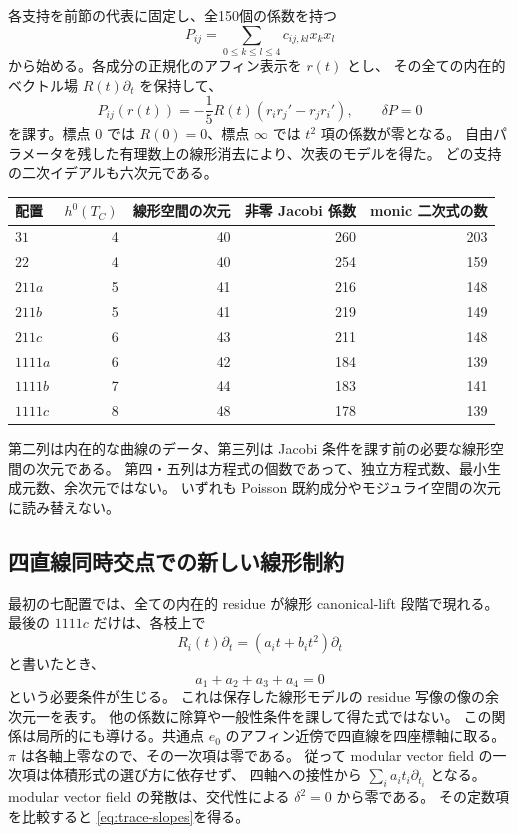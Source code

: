 \documentclass[11pt,a4paper]{ltjsarticle}
\theoremstyle{remark}\newtheorem{remark}[theorem]{注意}
\begin{document}
各支持を前節の代表に固定し、全150個の係数を持つ
\[
P_{ij}=\sum_{0\le k\le l\le4}c_{ij,kl}x_kx_l
\]
から始める。各成分の正規化のアフィン表示を $r(t)$ とし、
その全ての内在的ベクトル場 $R(t)\partial_t$ を保持して、
\begin{equation}\label{eq:tree-restriction}
P_{ij}(r(t))=-\frac15R(t)(r_i r_j'-r_j r_i'),\qquad \delta P=0
\end{equation}
を課す。標点 $0$ では $R(0)=0$、標点 $\infty$ では $t^2$ 項の係数が零となる。
自由パラメータを残した有理数上の線形消去により、次表のモデルを得た。
どの支持の二次イデアルも六次元である。

\begin{center}
\begin{tabular}{@{}lrrrr@{}}
\toprule
配置 & $h^0(T_C)$ & 線形空間の次元 & 非零 Jacobi 係数 & monic 二次式の数\\
\midrule
$31$ &4&40&260&203\\
$22$ &4&40&254&159\\
$211a$ &5&41&216&148\\
$211b$ &5&41&219&149\\
$211c$ &6&43&211&148\\
$1111a$ &6&42&184&139\\
$1111b$ &7&44&183&141\\
$1111c$ &8&48&178&139\\
\bottomrule
\end{tabular}
\end{center}

第二列は内在的な曲線のデータ、第三列は Jacobi 条件を課す前の必要な線形空間の次元である。
第四・五列は方程式の個数であって、独立方程式数、最小生成元数、余次元ではない。
いずれも Poisson 既約成分やモジュライ空間の次元に読み替えない。

\subsection{四直線同時交点での新しい線形制約}

最初の七配置では、全ての内在的 residue が線形 canonical-lift 段階で現れる。
最後の $1111c$ だけは、各枝上で
\[
R_i(t)\partial_t=(a_i t+b_i t^2)\partial_t
\]
と書いたとき、
\begin{equation}\label{eq:trace-slopes}
\boxed{a_1+a_2+a_3+a_4=0}
\end{equation}
という必要条件が生じる。
これは保存した線形モデルの residue 写像の像の余次元一を表す。
他の係数に除算や一般性条件を課して得た式ではない。
この関係は局所的にも導ける。共通点 $e_0$ のアフィン近傍で四直線を四座標軸に取る。
$\pi$ は各軸上零なので、その一次項は零である。
従って modular vector field の一次項は体積形式の選び方に依存せず、
四軸への接性から $\sum_i a_i t_i\partial_{t_i}$ となる。
modular vector field の発散は、交代性による $\delta^2=0$ から零である。
その定数項を比較すると \eqref{eq:trace-slopes}を得る。
\end{document}
